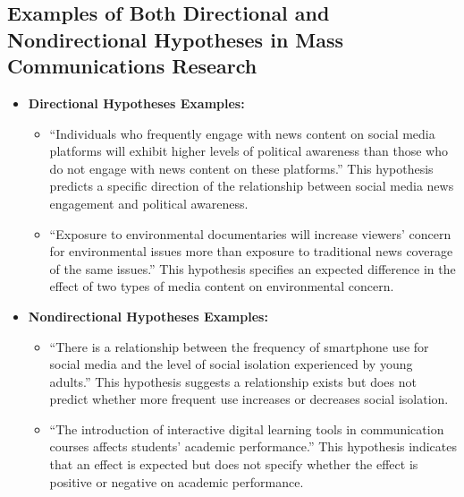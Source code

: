 \documentclass[
]{book}
\providecommand{\tightlist}{%
  \setlength{\itemsep}{0pt}\setlength{\parskip}{0pt}}
\begin{document}
\hypertarget{examples-of-both-directional-and-nondirectional-hypotheses-in-mass-communications-research}{%
\subsection*{Examples of Both Directional and Nondirectional Hypotheses in Mass Communications Research}\label{examples-of-both-directional-and-nondirectional-hypotheses-in-mass-communications-research}}

\begin{itemize}
\tightlist
\item
  \textbf{Directional Hypotheses Examples:}

  \begin{itemize}
  \tightlist
  \item
    ``Individuals who frequently engage with news content on social media platforms will exhibit higher levels of political awareness than those who do not engage with news content on these platforms.'' This hypothesis predicts a specific direction of the relationship between social media news engagement and political awareness.
  \item
    ``Exposure to environmental documentaries will increase viewers' concern for environmental issues more than exposure to traditional news coverage of the same issues.'' This hypothesis specifies an expected difference in the effect of two types of media content on environmental concern.
  \end{itemize}
\item
  \textbf{Nondirectional Hypotheses Examples:}

  \begin{itemize}
  \tightlist
  \item
    ``There is a relationship between the frequency of smartphone use for social media and the level of social isolation experienced by young adults.'' This hypothesis suggests a relationship exists but does not predict whether more frequent use increases or decreases social isolation.
  \item
    ``The introduction of interactive digital learning tools in communication courses affects students' academic performance.'' This hypothesis indicates that an effect is expected but does not specify whether the effect is positive or negative on academic performance.
  \end{itemize}
\end{itemize}
\end{document}
